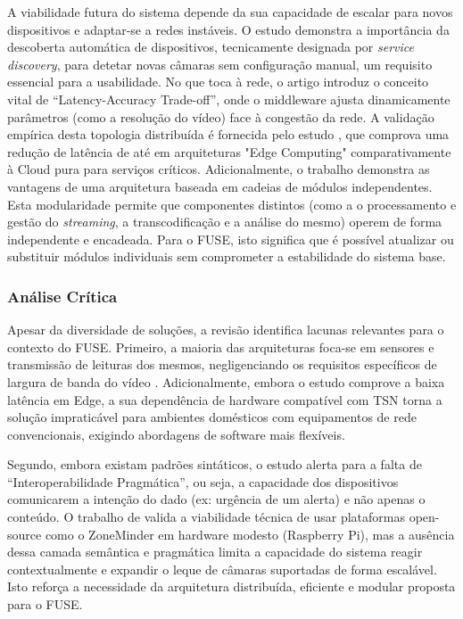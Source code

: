 A viabilidade futura do sistema depende da sua capacidade de escalar para novos dispositivos e adaptar-se a redes instáveis. O estudo \cite{mesmoudi_design_2018} demonstra a importância da descoberta automática de dispositivos, tecnicamente designada por \textit{service discovery}, para detetar novas câmaras sem configuração manual, um requisito essencial para a usabilidade. No que toca à rede, o artigo \cite{george_distributed_2019} introduz o conceito vital de ``Latency-Accuracy Trade-off'', onde o middleware ajusta dinamicamente parâmetros (como a resolução do vídeo) face à congestão da rede. A validação empírica desta topologia distribuída é fornecida pelo estudo \cite{gomez_strategies_2023}, que comprova uma redução de latência de até  em arquiteturas "Edge Computing" comparativamente à Cloud pura para serviços críticos. Adicionalmente, o trabalho \cite{immich_multi-tier_2019} demonstra as vantagens de uma arquitetura baseada em cadeias de módulos independentes. Esta modularidade permite que componentes distintos (como a o processamento e gestão do \textit{streaming}, a transcodificação e a análise do mesmo) operem de forma independente e encadeada. Para o \gls{FUSE}, isto significa que é possível atualizar ou substituir módulos individuais sem comprometer a estabilidade do sistema base.

\subsubsection{Análise Crítica}

Apesar da diversidade de soluções, a revisão identifica lacunas relevantes para o contexto do \gls{FUSE}. Primeiro, a maioria das arquiteturas foca-se em sensores e transmissão de leituras dos mesmos, negligenciando os requisitos específicos de largura de banda do vídeo \cite{barros_iot_2019}. Adicionalmente, embora o estudo \cite{gomez_strategies_2023} comprove a baixa latência em Edge, a sua dependência de hardware compatível com \gls{TSN} torna a solução impraticável para ambientes domésticos com equipamentos de rede convencionais, exigindo abordagens de software mais flexíveis.

Segundo, embora existam padrões sintáticos, o estudo \cite{muniz_pragmatic_2019} alerta para a falta de ``Interoperabilidade Pragmática'', ou seja, a capacidade dos dispositivos comunicarem a intenção do dado (ex: urgência de um alerta) e não apenas o conteúdo. O trabalho de \cite{resende_sistema_2025} valida a viabilidade técnica de usar plataformas open-source como o ZoneMinder em hardware modesto (Raspberry Pi), mas a ausência dessa camada semântica e pragmática limita a capacidade do sistema reagir contextualmente e expandir o leque de câmaras suportadas de forma escalável. Isto reforça a necessidade da arquitetura distribuída, eficiente e modular proposta para o \gls{FUSE}.

